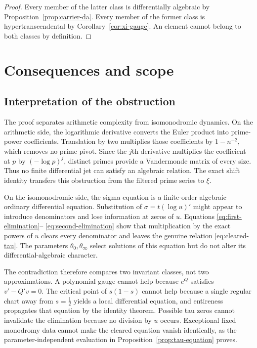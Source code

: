 \documentclass[11pt]{article}
\numberwithin{equation}{section}
\theoremstyle{definition}
\theoremstyle{remark}
\begin{document}
\begin{proof}
Every member of the latter class is differentially algebraic by
Proposition~\ref{prop:carrier-da}.  Every member of the former class is hypertranscendental by
Corollary~\ref{cor:xi-gauge}.  An element cannot belong to both classes by definition.
\end{proof}

\section{Consequences and scope}
\label{sec:scope}

\subsection{Interpretation of the obstruction}

The proof separates arithmetic complexity from isomonodromic dynamics.  On the arithmetic side,
the logarithmic derivative converts the Euler product into prime-power coefficients.  Translation
by two multiplies those coefficients by $1-n^{-2}$, which removes no prime pivot.  Since the
$j$th derivative multiplies the coefficient at $p$ by $(-\log p)^j$, distinct primes provide a
Vandermonde matrix of every size.  Thus no finite differential jet can satisfy an algebraic
relation.  The exact shift identity transfers this obstruction from the filtered prime series to
$\xi$.

On the isomonodromic side, the sigma equation is a finite-order algebraic ordinary differential
equation.  Substitution of $\sigma=t(\log u)'$ might appear to introduce denominators and lose
information at zeros of $u$.  Equations \eqref{eq:first-elimination}--
\eqref{eq:second-elimination} show that multiplication by the exact powers of $u$ clears every
denominator and leaves the genuine relation \eqref{eq:cleared-tau}.  The parameters
$\theta_0,\theta_\infty$ select solutions of this equation but do not alter its
differential-algebraic character.

The contradiction therefore compares two invariant classes, not two approximations.  A polynomial
gauge cannot help because $e^Q$ satisfies $v'-Q'v=0$.  The critical point of $s(1-s)$ cannot help
because a single regular chart away from $s=\tfrac12$ yields a local differential equation, and
entireness propagates that equation by the identity theorem.  Possible tau zeros cannot invalidate
the elimination because no division by $u$ occurs.  Exceptional fixed monodromy data cannot make
the cleared equation vanish identically, as the parameter-independent evaluation in
Proposition~\ref{prop:tau-equation} proves.
\end{document}
